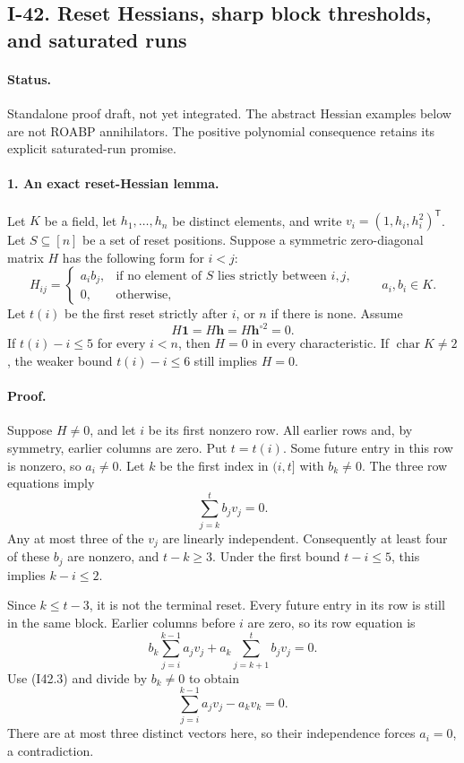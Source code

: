 \subsection{I-42. Reset Hessians, sharp block thresholds, and saturated runs}
\label{I-42}

\paragraph{Status.}
Standalone proof draft, not yet integrated. The abstract
Hessian examples below are not ROABP annihilators. The positive
polynomial consequence retains its explicit saturated-run
promise.

\paragraph{1. An exact reset-Hessian lemma.}
Let $K$ be a field, let $h_1,\ldots,h_n$ be distinct elements,
and write $v_i=(1,h_i,h_i^2)^{\mathsf T}$. Let $S\subseteq[n]$
be a set of reset positions. Suppose a symmetric zero-diagonal
matrix $H$ has the following form for $i<j$:
\[
 H_{ij}=\begin{cases}
 a_i b_j,&\text{if no element of $S$ lies strictly between $i,j$},\\
 0,&\text{otherwise},
 \end{cases}
 \qquad a_i,b_i\in K.
 \tag{I42.1}
\]
Let $t(i)$ be the first reset strictly after $i$, or $n$ if
there is none. Assume
\[
 H\mathbf1=H\mathbf h=H\mathbf h^{\circ2}=0.
 \tag{I42.2}
\]
If $t(i)-i\le5$ for every $i<n$, then $H=0$ in every
characteristic. If $\operatorname{char}K\ne2$, the weaker
bound $t(i)-i\le6$ still implies $H=0$.

\paragraph{Proof.}
Suppose $H\ne0$, and let $i$ be its first nonzero row.
All earlier rows and, by symmetry, earlier columns are zero.
Put $t=t(i)$. Some future entry in this row is nonzero,
so $a_i\ne0$. Let $k$ be the first index in $(i,t]$ with
$b_k\ne0$. The three row equations imply
\[
 \sum_{j=k}^t b_jv_j=0.
 \tag{I42.3}
\]
Any at most three of the $v_j$ are linearly independent.
Consequently at least four of these $b_j$ are nonzero, and
$t-k\ge3$. Under the first bound $t-i\le5$, this implies
$k-i\le2$.

Since $k\le t-3$, it is not the terminal reset. Every future
entry in its row is still in the same block. Earlier columns
before $i$ are zero, so its row equation is
\[
 b_k\sum_{j=i}^{k-1}a_jv_j+
 a_k\sum_{j=k+1}^t b_jv_j=0.
\]
Use (I42.3) and divide by $b_k\ne0$ to obtain
\[
 \sum_{j=i}^{k-1}a_jv_j-a_kv_k=0.
 \tag{I42.4}
\]
There are at most three distinct vectors here, so their
independence forces $a_i=0$, a contradiction.

